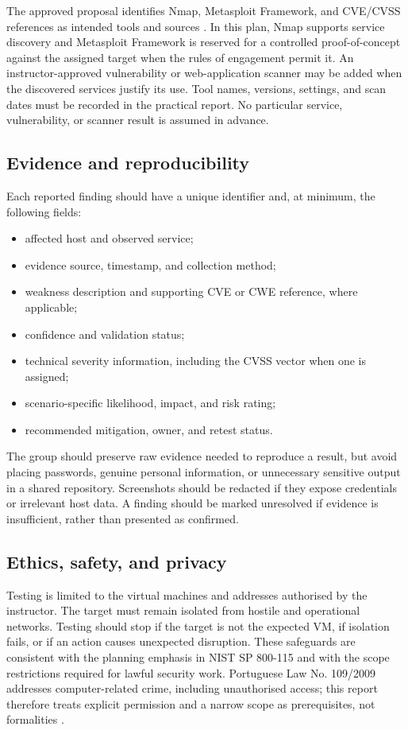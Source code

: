 \documentclass[11pt,a4paper]{article}
\begin{document}
The approved proposal identifies Nmap, Metasploit Framework, and CVE/CVSS references as intended tools and sources \citep{groupproposal2026}. In this plan, Nmap supports service discovery and Metasploit Framework is reserved for a controlled proof-of-concept against the assigned target when the rules of engagement permit it. An instructor-approved vulnerability or web-application scanner may be added when the discovered services justify its use. Tool names, versions, settings, and scan dates must be recorded in the practical report. No particular service, vulnerability, or scanner result is assumed in advance.

\subsection{Evidence and reproducibility}
Each reported finding should have a unique identifier and, at minimum, the following fields:
\begin{itemize}
  \item affected host and observed service;
  \item evidence source, timestamp, and collection method;
  \item weakness description and supporting CVE or CWE reference, where applicable;
  \item confidence and validation status;
  \item technical severity information, including the CVSS vector when one is assigned;
  \item scenario-specific likelihood, impact, and risk rating;
  \item recommended mitigation, owner, and retest status.
\end{itemize}
The group should preserve raw evidence needed to reproduce a result, but avoid placing passwords, genuine personal information, or unnecessary sensitive output in a shared repository. Screenshots should be redacted if they expose credentials or irrelevant host data. A finding should be marked unresolved if evidence is insufficient, rather than presented as confirmed.

\subsection{Ethics, safety, and privacy}
Testing is limited to the virtual machines and addresses authorised by the instructor. The target must remain isolated from hostile and operational networks. Testing should stop if the target is not the expected VM, if isolation fails, or if an action causes unexpected disruption. These safeguards are consistent with the planning emphasis in NIST SP 800-115 \citep{scarfone2008} and with the scope restrictions required for lawful security work. Portuguese Law No. 109/2009 addresses computer-related crime, including unauthorised access; this report therefore treats explicit permission and a narrow scope as prerequisites, not formalities \citep{portugal2009}.
\end{document}
